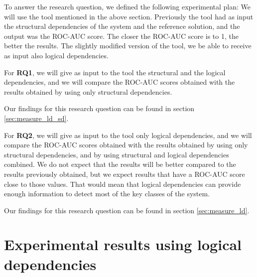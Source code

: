 \documentclass[runningheads]{comsis2}
\begin{document}
To answer the research question, we defined the following experimental plan: 
We will use the tool mentioned in the above section. Previously the tool had as input the structural dependencies of the system and the reference solution, and the output was the ROC-AUC score. The closer the ROC-AUC score is to 1, the better the results.  
The slightly modified version of the tool, we be able to receive as input also logical dependencies.


For \textbf {RQ1}, we will give as input to the tool the structural and the logical dependencies, and we will compare the ROC-AUC scores obtained with the results obtained by using only structural dependencies.


\noindent{}
\medskip

Our findings for this research question can be found in section \ref{sec:measure_ld_sd}.


For \textbf {RQ2}, we will give as input to the tool only logical dependencies, and we will compare the ROC-AUC scores obtained with the results obtained by using only structural dependencies, and by using structural and logical dependencies combined.
We do not expect that the results will be better compared to the results previously obtained, but we expect results that have a ROC-AUC score close to those values. That would mean that logical dependencies can provide enough information to detect most of the key classes of the system.

\medskip

\noindent{}

\medskip

Our findings for this research question can be found in section \ref{sec:measure_ld}.

\section{Experimental results using logical dependencies}
\label{sec:current_measurements}
\end{document}
